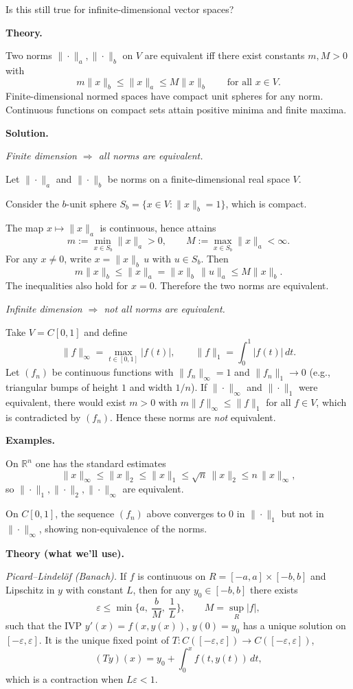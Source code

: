 \documentclass[12pt,a4paper]{article}
\begin{document}
Is this still true for infinite-dimensional vector spaces?

\medskip
\textbf{Theory.}

Two norms $\|\cdot\|_a,\|\cdot\|_b$ on $V$ are equivalent iff
there exist constants $m,M>0$ with
\[
m\|x\|_b \le \|x\|_a \le M\|x\|_b \qquad \text{for all } x\in V.
\]
Finite-dimensional normed spaces have compact unit spheres for any norm.
Continuous functions on compact sets attain positive minima and finite maxima.

\medskip
\textbf{Solution.}

\emph{Finite dimension $\Rightarrow$ all norms are equivalent.}

Let $\|\cdot\|_a$ and $\|\cdot\|_b$ be norms on a finite-dimensional real space $V$.

Consider the $b$-unit sphere $S_b=\{x\in V:\|x\|_b=1\}$, which is compact.

The map $x\mapsto\|x\|_a$ is continuous, hence attains
\[
m:=\min_{x\in S_b}\|x\|_a>0,
\qquad
M:=\max_{x\in S_b}\|x\|_a<\infty.
\]
For any $x\neq 0$, write $x=\|x\|_b\,u$ with $u\in S_b$. Then
\[
m\|x\|_b \le \|x\|_a = \|x\|_b\,\|u\|_a \le M\|x\|_b.
\]
The inequalities also hold for $x=0$. Therefore the two norms are equivalent.

\medskip
\emph{Infinite dimension $\Rightarrow$ not all norms are equivalent.}

Take $V=C[0,1]$ and define
\[
\|f\|_\infty=\max_{t\in[0,1]}|f(t)|,
\qquad
\|f\|_1=\int_0^1 |f(t)|\,dt.
\]
Let $(f_n)$ be continuous functions with $\|f_n\|_\infty=1$ and
$\|f_n\|_1\to 0$ (e.g., triangular bumps of height $1$ and width $1/n$).
If $\|\cdot\|_\infty$ and $\|\cdot\|_1$ were equivalent, there would exist $m>0$
with $m\|f\|_\infty\le \|f\|_1$ for all $f\in V$, which is contradicted by $(f_n)$.
Hence these norms are \emph{not} equivalent.

\medskip
\textbf{Examples.}

On $\mathbb R^n$ one has the standard estimates
\[
\|x\|_\infty \le \|x\|_2 \le \|x\|_1 \le \sqrt{n}\,\|x\|_2 \le n\,\|x\|_\infty,
\]
so $\|\cdot\|_1,\|\cdot\|_2,\|\cdot\|_\infty$ are equivalent.

On $C[0,1]$, the sequence $(f_n)$ above converges to $0$ in $\|\cdot\|_1$
but not in $\|\cdot\|_\infty$, showing non-equivalence of the norms.

\textbf{Theory (what we’ll use).}

\emph{Picard--Lindel\"of (Banach).}
If $f$ is continuous on $R=[-a,a]\times[-b,b]$ and Lipschitz in $y$ with constant $L$,
then for any $y_0\in[-b,b]$ there exists
\[
\varepsilon\le \min\Big\{a,\ \frac{b}{M},\ \frac{1}{L}\Big\},\qquad M=\sup_R |f|,
\]
such that the IVP $y'(x)=f(x,y(x))$, $y(0)=y_0$ has a unique solution on $[-\varepsilon,\varepsilon]$.
It is the unique fixed point of $T:C([-\varepsilon,\varepsilon])\to C([-\varepsilon,\varepsilon])$,
\[
(Ty)(x)=y_0+\int_0^x f(t,y(t))\,dt,
\]
which is a contraction when $L\varepsilon<1$.
\end{document}
